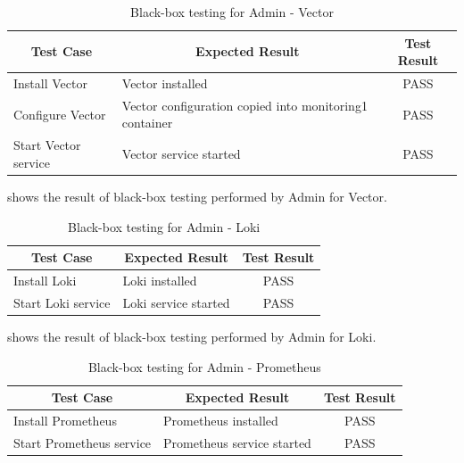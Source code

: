 \documentclass[../index.tex]{subfiles}
\begin{document}
\begin{table}[h!]
  \begin{tabularx}{\textwidth}{|m{8em}|X|c|} 
    \hline
    \multicolumn{1}{|c|}{Test Case} & \multicolumn{1}{c|}{Expected Result} & \multicolumn{1}{c|}{Test Result} \\
    \hline
    Install Vector                  & Vector installed                     & PASS \\ 
    Configure Vector                & Vector configuration copied into monitoring1 container & PASS \\
    Start Vector service            & Vector service started               & PASS \\ 
    \hline
  \end{tabularx}
  \caption{Black-box testing for Admin - Vector}
  \label{table:blackbox_vector}
\end{table}

 shows the result of black-box testing performed by Admin for Vector.

\begin{table}[h!]
  \begin{tabularx}{\textwidth}{|m{8em}|X|c|} 
    \hline
    \multicolumn{1}{|c|}{Test Case} & \multicolumn{1}{c|}{Expected Result} & \multicolumn{1}{c|}{Test Result} \\
    \hline
    Install Loki                    & Loki installed                       & PASS \\ 
    Start Loki service              & Loki service started                 & PASS \\ 
    \hline
  \end{tabularx}
  \caption{Black-box testing for Admin - Loki}
  \label{table:blackbox_loki}
\end{table}

 shows the result of black-box testing performed by Admin for Loki.

\begin{table}[h!]
  \begin{tabularx}{\textwidth}{|m{12em}|X|c|} 
    \hline
    \multicolumn{1}{|c|}{Test Case} & \multicolumn{1}{c|}{Expected Result} & \multicolumn{1}{c|}{Test Result} \\
    \hline
    Install Prometheus              & Prometheus installed                 & PASS \\ 
    Start Prometheus service        & Prometheus service started           & PASS \\ 
    \hline
  \end{tabularx}
  \caption{Black-box testing for Admin - Prometheus}
  \label{table:blackbox_prometheus}
\end{table}
\end{document}
